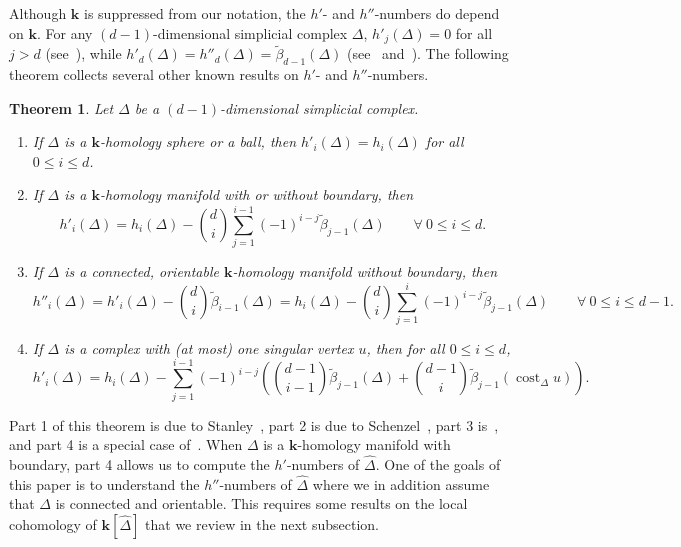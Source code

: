 \documentclass[10pt]{amsart}
\newtheorem{theorem}{Theorem}[section]
\theoremstyle{definition}
\DeclareMathOperator\cost{cost}
\newcommand{\complet}[1]{\hat{#1}}
\newcommand{\field}{\mathbf{k}}
\begin{document}
Although $\field$ is suppressed from our notation, the $h'$- and $h''$-numbers do depend on $\field$. For any $(d-1)$-dimensional simplicial complex $\Delta$, $h'_j(\Delta)=0$ for all $j>d$ (see~\cite[Proposition~III.2.4(b)]{Stanley-96}), while $h'_d(\Delta)=h''_d(\Delta)=\tilde{\beta}_{d-1}(\Delta)$ (see~\cite[Theorem~4.1]{TayWhiteley} and~\cite[Lemma~2.2(3)]{Babson-Novik}). The following theorem collects several other known results on $h'$- and $h''$-numbers.

\goodbreak
\begin{theorem} \label{known-h'-h''} Let $\Delta$ be a $(d-1)$-dimensional simplicial complex.
\begin{enumerate}
\item\label{theo2.2_1} If $\Delta$ is a $\field$-homology sphere or a ball, then $h'_i(\Delta)=h_i(\Delta)$ for all $0\leq i\leq d$.
\item\label{theo2.2_2} If $\Delta$ is a $\field$-homology manifold with or without boundary, then 
\[h'_i(\Delta)=h_i(\Delta)-\binom{d}{i}\sum_{j=1}^{i-1}(-1)^{i-j}\tilde{\beta}_{j-1}(\Delta) \qquad \forall ~0\leq i\leq d.\]
\item\label{theo2.2_3} If $\Delta$ is a connected, orientable $\field$-homology manifold without boundary, then 
\[h''_i(\Delta)=h'_i(\Delta)-\binom{d}{i}\tilde{\beta}_{i-1}(\Delta)=
 h_i(\Delta)-\binom{d}{i}\sum_{j=1}^{i}(-1)^{i-j}\tilde{\beta}_{j-1}(\Delta) \qquad \forall ~ 0\leq i\leq d-1.\]
\item\label{theo2.2_4} If $\Delta$ is a complex with (at most) one singular vertex $u$, then for all $0\leq i\leq d$,
\[h'_i(\Delta)=h_i(\Delta)-\sum_{j=1}^{i-1}(-1)^{i-j}\left(\binom{d-1}{i-1}\tilde{\beta}_{j-1}(\Delta)+\binom{d-1}{i}\tilde{\beta}_{j-1}(\cost_{\Delta}u)\right).\]
\end{enumerate}
\end{theorem}

\noindent Part 1 of this theorem is due to Stanley~\cite{Stanley-75}, part 2 is due to Schenzel~\cite{Schenzel-81}, part 3 is~\cite[Theorem~1.3]{Novik-Swartz-09:Gorenstein}, and part 4 is a special case of~\cite[Theorem~4.7]{Novik-Swartz-12}. When $\Delta$ is a $\field$-homology manifold with boundary, part 4 allows us to compute the $h'$-numbers of $\complet{\Delta}$. One of the goals of this paper is to understand the $h''$-numbers of $\complet{\Delta}$ where we in addition assume that $\Delta$ is connected and orientable. This requires some results on the local cohomology of $\field[\complet{\Delta}]$ that we review in the next subsection.
\end{document}
